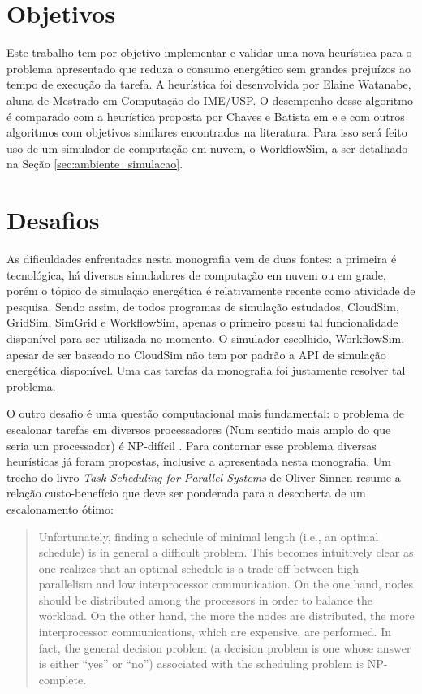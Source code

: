 \section{Objetivos}
\label{sec:objetivos}
Este trabalho tem por objetivo implementar e validar uma nova heurística para o
problema apresentado que reduza o consumo energético sem grandes prejuízos
ao tempo de execução da tarefa. A heurística foi desenvolvida por Elaine Watanabe, 
aluna de Mestrado em Computação do IME/USP. O desempenho desse algoritmo é
comparado com a heurística proposta por Chaves e Batista em
\cite{chaves:scheduling_software_requirements} e
\cite{batista:embedding_software_requirements} e com outros algoritmos com
objetivos similares encontrados na literatura. Para isso será feito uso de um
simulador de computação em nuvem, o WorkflowSim, a ser detalhado na Seção
\ref{sec:ambiente_simulacao}.


\section{Desafios}
\label{sec:desafios}
As dificuldades enfrentadas nesta monografia vem de duas fontes: a primeira é
tecnológica, há diversos simuladores de computação em nuvem ou em grade, porém
o tópico de simulação energética é relativamente recente como atividade de 
pesquisa. Sendo assim, de todos programas de simulação estudados, CloudSim, 
GridSim, SimGrid e WorkflowSim, apenas o primeiro possui tal funcionalidade
disponível para ser utilizada no momento. O simulador escolhido, WorkflowSim,
apesar de ser baseado no CloudSim  não tem por padrão a API de simulação energética
disponível. Uma das tarefas da monografia foi justamente resolver tal problema.

O outro desafio é uma questão computacional mais fundamental: o problema de 
escalonar tarefas em diversos processadores (Num sentido mais amplo do que seria
um processador) é NP-difícil \cite{sinnen:task_scheduling_parallel_systems}.
Para contornar esse problema diversas heurísticas já foram propostas, inclusive
a apresentada nesta monografia. Um trecho do livro
\emph{Task Scheduling for Parallel Systems} de Oliver Sinnen resume a relação
custo-benefício que deve ser ponderada para a descoberta de um escalonamento
ótimo:

\begin{quote}
Unfortunately, finding a schedule of minimal length (i.e., an optimal schedule)
is in general a difficult problem. This becomes intuitively clear as one realizes that
an optimal schedule is a trade-off between high parallelism and low interprocessor
communication. On the one hand, nodes should be distributed among the processors
in order to balance the workload. On the other hand, the more the nodes are distributed,
the more interprocessor communications, which are expensive, are performed. In fact,
the general decision problem (a decision problem is one whose answer is either ``yes''
or ``no'') associated with the scheduling problem is NP-complete. 
\cite{sinnen:task_scheduling_parallel_systems}
\end{quote}



